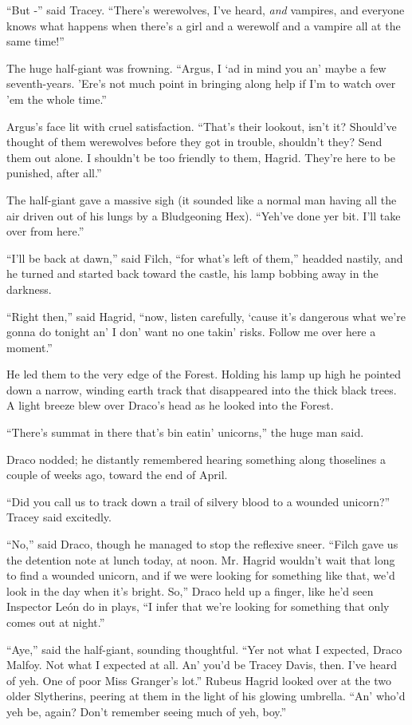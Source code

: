 ``But -'' said Tracey. ``There's werewolves, I've heard, \emph{and} vampires, and everyone knows what happens when there's a girl and a werewolf and a vampire all at the same time!''

The huge half-giant was frowning. ``Argus, I `ad in mind you an' maybe a few seventh-years. 'Ere's not much point in bringing along help if I'm to watch over 'em the whole time.''

Argus's face lit with cruel satisfaction. ``That's their lookout, isn't it? Should've thought of them werewolves before they got in trouble, shouldn't they? Send them out alone. I shouldn't be too friendly to them, Hagrid. They're here to be punished, after all.''

The half-giant gave a massive sigh (it sounded like a normal man having all the air driven out of his lungs by a Bludgeoning Hex). ``Yeh've done yer bit. I'll take over from here.''

``I'll be back at dawn,'' said Filch, ``for what's left of them,'' headded nastily, and he turned and started back toward the castle, his lamp bobbing away in the darkness.

``Right then,'' said Hagrid, ``now, listen carefully, `cause it's dangerous what we're gonna do tonight an' I don' want no one takin' risks. Follow me over here a moment.''

He led them to the very edge of the Forest. Holding his lamp up high he pointed down a narrow, winding earth track that disappeared into the thick black trees. A light breeze blew over Draco's head as he looked into the Forest.

``There's summat in there that's bin eatin' unicorns,'' the huge man said.

Draco nodded; he distantly remembered hearing something along thoselines a couple of weeks ago, toward the end of April.

``Did you call us to track down a trail of silvery blood to a wounded unicorn?'' Tracey said excitedly.

``No,'' said Draco, though he managed to stop the reflexive sneer. ``Filch gave us the detention note at lunch today, at noon. Mr. Hagrid wouldn't wait that long to find a wounded unicorn, and if we were looking for something like that, we'd look in the day when it's bright. So,'' Draco held up a finger, like he'd seen Inspector León do in plays, ``I infer that we're looking for something that only comes out at night.''

``Aye,'' said the half-giant, sounding thoughtful. ``Yer not what I expected, Draco Malfoy. Not what I expected at all. An' you'd be Tracey Davis, then. I've heard of yeh. One of poor Miss Granger's lot.'' Rubeus Hagrid looked over at the two older Slytherins, peering at them in the light of his glowing umbrella. ``An' who'd yeh be, again? Don't remember seeing much of yeh, boy.''

